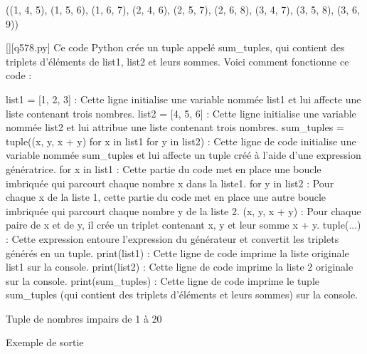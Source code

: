((1, 4, 5), (1, 5, 6), (1, 6, 7), (2, 4, 6), (2, 5, 7), (2, 6, 8), (3, 4, 7), (3, 5, 8), (3, 6, 9))
        \par
        \begin{solution}
            \renewcommand{\nomfichier}{q578.py}
            \pythonfile{\chemincode \nomfichier}[][\nomfichier]
            Ce code Python crée un tuple appelé sum\_tuples, qui contient des triplets d'éléments de list1, list2 et leurs sommes. Voici comment fonctionne ce code :

    list1 = [1, 2, 3] : Cette ligne initialise une variable nommée list1 et lui affecte une liste contenant trois nombres.
    list2 = [4, 5, 6] : Cette ligne initialise une variable nommée list2 et lui attribue une liste contenant trois nombres.
    sum\_tuples = tuple((x, y, x + y) for x in list1 for y in list2) : Cette ligne de code initialise une variable nommée sum\_tuples et lui affecte un tuple créé à l'aide d'une expression génératrice.
        for x in list1 : Cette partie du code met en place une boucle imbriquée qui parcourt chaque nombre x dans la liste1.
        for y in list2 : Pour chaque x de la liste 1, cette partie du code met en place une autre boucle imbriquée qui parcourt chaque nombre y de la liste 2.
        (x, y, x + y) : Pour chaque paire de x et de y, il crée un triplet contenant x, y et leur somme x + y.
        tuple(...) : Cette expression entoure l'expression du générateur et convertit les triplets générés en un tuple.
    print(list1) : Cette ligne de code imprime la liste originale list1 sur la console.
    print(list2) : Cette ligne de code imprime la liste 2 originale sur la console.
    print(sum\_tuples) : Cette ligne de code imprime le tuple sum\_tuples (qui contient des triplets d'éléments et leurs sommes) sur la console.
        \end{solution}
        

        \question
        Tuple de nombres impairs de 1 à 20

Exemple de sortie

